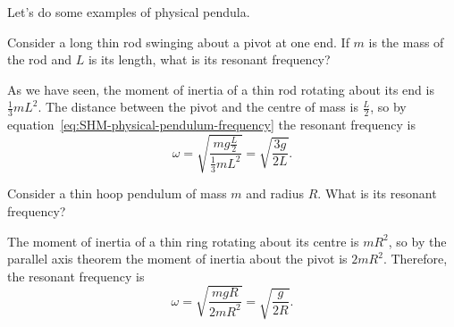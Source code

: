 \documentclass[../classical_mechanics.tex]{subfiles}
\begin{document}
        Let's do some examples of physical pendula.
        \begin{example}
            Consider a long thin rod swinging about a pivot at one end.
            If $m$ is the mass of the rod and $L$ is its length, what is its resonant frequency?

            As we have seen, the moment of inertia of a thin rod rotating about its end is $\frac{1}{3}mL^2$.
            The distance between the pivot and the centre of mass is $\frac{L}{2}$, so by equation~\ref{eq:SHM-physical-pendulum-frequency} the resonant frequency is
            \begin{equation}
                \omega=\sqrt{\frac{mg\frac{L}{2}}{\frac{1}{3}mL^2}}=\sqrt{\frac{3g}{2L}}.
            \end{equation}
        \end{example}
        \begin{example}
            Consider a thin hoop pendulum of mass $m$ and radius $R$.
            What is its resonant frequency?

            The moment of inertia of a thin ring rotating about its centre is $mR^2$, so by the parallel axis theorem the moment of inertia about the pivot is $2mR^2$.
            Therefore, the resonant frequency is
            \begin{equation}
                \omega=\sqrt{\frac{mgR}{2mR^2}}=\sqrt{\frac{g}{2R}}.
            \end{equation}
        \end{example}
\end{document}
